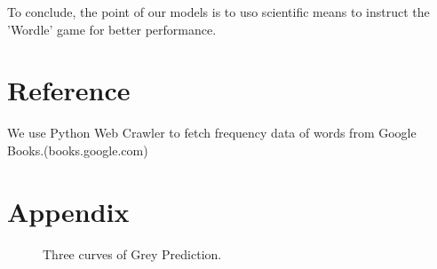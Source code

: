 \documentclass[12pt]{article}
\begin{document}
 To conclude, the point of our models is to uso scientific means to instruct the 'Wordle' game for better performance.

 \section{Reference}

 We use Python Web Crawler to fetch frequency data of words from Google Books.(books.google.com)

\newpage


\newpage{}
\section{Appendix}
\vspace{2cm}
\begin{figure}[htbp]
	\centering
	\hspace{2mm}
	\hspace{2mm}
	\caption{Three curves of Grey Prediction.}
\end {figure}
\end{document}
